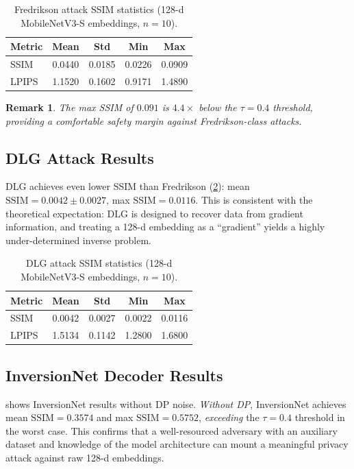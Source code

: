 \documentclass[journal]{IEEEtran}
\newtheorem{remark}{Remark}
\newcommand{\ssim}{\mathrm{SSIM}}
\newcommand{\MN}{MobileNetV3-S\xspace}
\begin{document}
\begin{table}[tb]
  \centering
  \caption{Fredrikson attack SSIM statistics (128-d \MN embeddings, $n=10$).}
  \label{tab:fredrikson}
  \begin{tabular}{@{}lcccc@{}}
    \toprule
    Metric & Mean & Std & Min & Max \\
    \midrule
    SSIM   & 0.0440 & 0.0185 & 0.0226 & 0.0909 \\
    LPIPS  & 1.1520 & 0.1602 & 0.9171 & 1.4890 \\
    \bottomrule
  \end{tabular}
\end{table}

\begin{remark}
The max SSIM of $0.091$ is $4.4\times$ below the $\tau = 0.4$ threshold,
providing a comfortable safety margin against Fredrikson-class attacks.
\end{remark}

\subsection{DLG Attack Results}

DLG achieves even lower SSIM than Fredrikson
(\cref{tab:dlg}): mean $\ssim = 0.0042 \pm 0.0027$,
max $\ssim = 0.0116$.
This is consistent with the theoretical expectation: DLG is designed
to recover data from gradient information, and treating a 128-d
embedding as a ``gradient'' yields a highly under-determined
inverse problem.

\begin{table}[tb]
  \centering
  \caption{DLG attack SSIM statistics (128-d \MN embeddings, $n=10$).}
  \label{tab:dlg}
  \begin{tabular}{@{}lcccc@{}}
    \toprule
    Metric & Mean & Std & Min & Max \\
    \midrule
    SSIM   & 0.0042 & 0.0027 & 0.0022 & 0.0116 \\
    LPIPS  & 1.5134 & 0.1142 & 1.2800 & 1.6800 \\
    \bottomrule
  \end{tabular}
\end{table}

\subsection{InversionNet Decoder Results}

 shows InversionNet results without DP noise.
\emph{Without DP}, InversionNet achieves mean $\ssim = 0.3574$ and
max $\ssim = 0.5752$, \emph{exceeding} the $\tau = 0.4$ threshold
in the worst case.
This confirms that a well-resourced adversary with an auxiliary dataset
and knowledge of the model architecture can mount a meaningful privacy
attack against raw 128-d embeddings.
\end{document}
